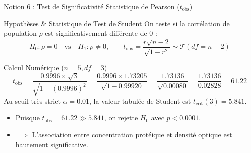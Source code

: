\documentclass[aspectratio=169,10pt]{beamer}
\begin{document}
\begin{frame}{Notion 6 : Test de Significativité Statistique de Pearson ($t_{\text{obs}}$)}
  \begin{conceptbox}{Hypothèses \& Statistique de Test de Student}
    \footnotesize
    On teste si la corrélation de population $\rho$ est significativement différente de 0 :
    \begin{equation*}
      H_0 : \rho = 0 \quad \text{vs} \quad H_1 : \rho \neq 0, \qquad t_{\text{obs}} = \frac{r \sqrt{n - 2}}{\sqrt{1 - r^2}} \sim \mathcal{T}(df = n - 2)
    \end{equation*}
  \end{conceptbox}
  \vspace{1mm}
  \begin{biobox}{Calcul Numérique ($n = 5, df = 3$)}
    \footnotesize
    \begin{equation*}
      t_{\text{obs}} = \frac{0.9996 \times \sqrt{3}}{\sqrt{1 - (0.9996)^2}} = \frac{0.9996 \times 1.73205}{\sqrt{1 - 0.99920}} = \frac{1.73136}{\sqrt{0.00080}} = \frac{1.73136}{0.02828} = \mathbf{61.22}
    \end{equation*}
    Au seuil très strict $\alpha = 0.01$, la valeur tabulée de Student est $t_{\text{crit}}(3) = 5.841$.
    \begin{itemize}
      \item Puisque $t_{\text{obs}} = 61.22 \gg 5.841$, on rejette $H_0$ avec $p < 0.0001$.
      \item $\implies$ L'association entre concentration protéique et densité optique est hautement significative.
    \end{itemize}
  \end{biobox}
\end{frame}
\end{document}
